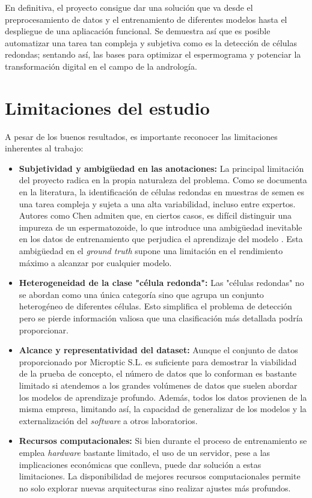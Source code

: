 \documentclass[12pt,a4paper,onecolumn,oneside]{report}
\begin{document}
En definitiva, el proyecto consigue dar una solución que va desde el preprocesamiento de datos y el entrenamiento de diferentes modelos hasta el despliegue de una apliacación funcional. Se demuestra así que es posible automatizar 
una tarea tan compleja y subjetiva como es la detección de células redondas; sentando así, las bases para optimizar el espermograma y potenciar la transformación digital en el campo de la andrología.

\section{Limitaciones del estudio}
\label{sec:Limitaciones del estudio}

A pesar de los buenos resultados, es importante reconocer las limitaciones inherentes al trabajo:

\begin{itemize}
  \item \textbf{Subjetividad y ambigüedad en las anotaciones:} La principal limitación del proyecto radica en la propia naturaleza del problema. Como se documenta en la literatura, 
  la identificación de células redondas en muestras de semen es una tarea compleja y sujeta a una alta variabilidad, incluso entre expertos. Autores como Chen admiten que,
  en ciertos casos, es difícil distinguir una impureza de un espermatozoide, lo que introduce una ambigüedad inevitable en los datos de entrenamiento que perjudica el aprendizaje del modelo \cite{chen2024}.
  Esta ambigüedad en el \textit{ground truth} supone una limitación en el rendimiento máximo a alcanzar por cualquier modelo.
  \item \textbf{Heterogeneidad de la clase "célula redonda":} Las "células redondas" no se abordan como una única categoría sino que agrupa un conjunto heterogéneo de diferentes células. Esto simplifica el problema de detección pero se pierde información valiosa 
  que una clasificación más detallada podría proporcionar.
  \item \textbf{Alcance y representatividad del dataset:} Aunque el conjunto de datos proporcionado por Microptic S.L. \cite{microptic} es suficiente para demostrar la viabilidad de la prueba de concepto, 
  el número de datos que lo conforman es bastante limitado si atendemos a los grandes volúmenes de datos que suelen abordar los modelos de aprendizaje profundo. Además, todos los datos provienen de la misma empresa, limitando así, la capacidad de generalizar de los modelos
  y la externalización del \textit{software} a otros laboratorios.
  \item \textbf{Recursos computacionales:} Si bien durante el proceso de entrenamiento se emplea \textit{hardware} bastante limitado, el uso de un servidor, pese a las implicaciones económicas que conlleva, puede dar solución a estas limitaciones.
  La disponibilidad de mejores recursos computacionales permite no solo explorar nuevas arquitecturas sino realizar ajustes más profundos.
\end{itemize}
\end{document}
